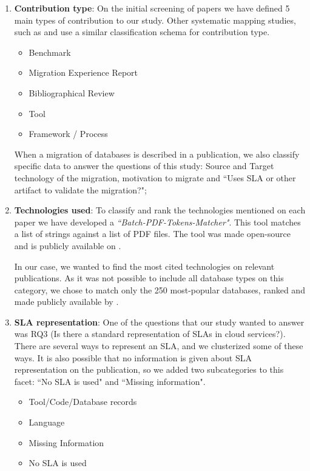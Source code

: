 \documentclass[conference, 10pt, a4paper]{IEEEtran}
\begin{document}
\begin{enumerate}
    \item \textbf{Contribution type}: On the initial screening of papers we have defined 5 main types of contribution to our study. Other systematic mapping studies, such as \cite{6405289} and \cite{Ameller201542} use a similar classification schema for contribution type.
    \begin{itemize}
      \item Benchmark
      \item Migration Experience Report
      \item Bibliographical Review
      \item Tool
      \item Framework / Process
    \end{itemize}

    When a migration of databases is described in a publication, we also classify specific data to answer the questions of this study:  Source and Target technology of the migration, motivation to migrate and ``Uses SLA or other artifact to validate the migration?"; 

    \item \textbf{Technologies used}: To classify and rank the technologies mentioned on each paper we have developed a \textit{``Batch-PDF-Tokens-Matcher"}. This tool matches a list of strings against a list of PDF files. The tool was made open-source and is publicly available on \cite{pythonBatchPDFTokenMatcher}.

    In our case, we wanted to find the most cited technologies on relevant publications. As it was not possible to include all database types on this category, we chose to match only the 250 most-popular databases, ranked and made publicly available by \cite{dbranking}.

    \item \textbf{SLA representation}: One of the questions that our study wanted to answer was RQ3 (Is there a standard representation of SLAs in cloud services?). There are several ways to represent an SLA, and we clusterized some of these ways. It is also possible that no information is given about SLA representation on the publication, so we added two subcategories to this facet: ``No SLA is used" and ``Missing information".  
    \begin{itemize}
      \item Tool/Code/Database records
      \item Language
      \item Missing Information
      \item No SLA is used
    \end{itemize}  
\end{enumerate}
\end{document}
